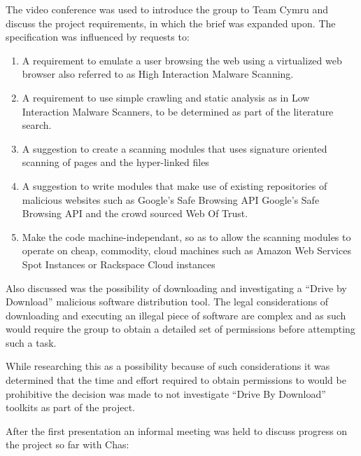 The video conference was used to introduce the group to Team Cymru and discuss the project requirements, in which the brief was expanded upon. The specification was influenced by requests to:
\begin{enumerate}
    \item A requirement to emulate a user browsing the web using a virtualized web browser also referred to as High Interaction Malware Scanning.

    \item A requirement to use simple crawling and static analysis as in Low Interaction Malware Scanners, to be determined as part of the literature search.

    \item A suggestion to create a scanning modules that uses signature oriented scanning of pages and the hyper-linked files

    \item A suggestion to write modules that make use of existing repositories of malicious websites such as Google's Safe Browsing API\cite{google-safe} Google's Safe Browsing API and the crowd sourced Web Of Trust.

    \item Make the code machine-independant, so as to allow the scanning modules to operate on cheap, commodity, cloud machines such as Amazon Web Services Spot Instances\cite{aws-spot} or Rackspace Cloud instances\cite{rackspace}
\end{enumerate}

Also discussed was the possibility of downloading and investigating a ``Drive by Download'' malicious software distribution tool.  The legal considerations of downloading and executing an illegal piece of software are complex and as such would require the group to obtain a detailed set of permissions before attempting such a task.

While researching this as a possibility because of such considerations it was determined that the time and effort required to obtain permissions to would be prohibitive the decision was made to not investigate ``Drive By Download'' toolkits as part of the project.

After the first presentation an informal meeting was held to discuss progress on the project so far with Chas:

